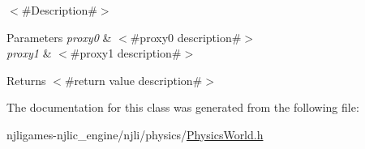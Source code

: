 $<$\#\+Description\#$>$


\begin{DoxyParams}{Parameters}
{\em proxy0} & $<$\#proxy0 description\#$>$ \\
\hline
{\em proxy1} & $<$\#proxy1 description\#$>$\\
\hline
\end{DoxyParams}
\begin{DoxyReturn}{Returns}
$<$\#return value description\#$>$ 
\end{DoxyReturn}


The documentation for this class was generated from the following file\+:\begin{DoxyCompactItemize}
\item 
njligames-\/njlic\+\_\+engine/njli/physics/\mbox{\hyperlink{_physics_world_8h}{Physics\+World.\+h}}\end{DoxyCompactItemize}
